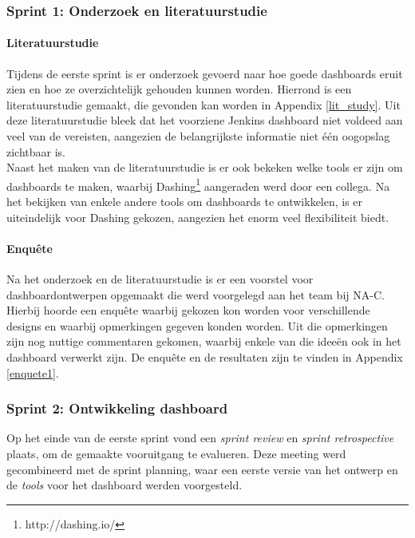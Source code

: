 \documentclass[10pt,a4paper]{article}
\begin{document}
\subsubsection{Sprint 1: Onderzoek en literatuurstudie} 
\label{sprint1}
\paragraph{Literatuurstudie} Tijdens de eerste sprint is er onderzoek gevoerd naar hoe goede dashboards eruit zien en hoe ze overzichtelijk gehouden kunnen worden. Hierrond is een literatuurstudie gemaakt, die gevonden kan worden in Appendix \ref{lit_study}. Uit deze literatuurstudie bleek dat het voorziene Jenkins dashboard niet voldeed aan veel van de vereisten, aangezien de belangrijkste informatie niet \'e\'en oogopslag zichtbaar is.\\
Naast het maken van de literatuurstudie is er ook bekeken welke tools er zijn om dashboards te maken, waarbij Dashing\footnote{http://dashing.io/} aangeraden werd door een collega. Na het bekijken van enkele andere tools om dashboards te ontwikkelen, is er uiteindelijk voor Dashing gekozen, aangezien het enorm veel flexibiliteit biedt.
\paragraph{Enqu\^ete}
Na het onderzoek en de literatuurstudie is er een voorstel voor dashboardontwerpen opgemaakt die werd voorgelegd aan het team bij NA-C. Hierbij hoorde een enqu\^ete waarbij gekozen kon worden voor verschillende designs en waarbij opmerkingen gegeven konden worden. Uit die opmerkingen zijn nog nuttige commentaren gekomen, waarbij enkele van die idee\"en ook in het dashboard verwerkt zijn. De enqu\^ete en de resultaten zijn te vinden in Appendix \ref{enquete1}. 
\subsubsection{Sprint 2: Ontwikkeling dashboard} 
\label{sprint2}
Op het einde van de eerste sprint vond een \textit{sprint review} en \textit{sprint retrospective} plaats, om de gemaakte vooruitgang te evalueren. Deze meeting werd gecombineerd met de sprint planning, waar een eerste versie van het ontwerp en de \textit{tools} voor het dashboard werden voorgesteld.
\end{document}
